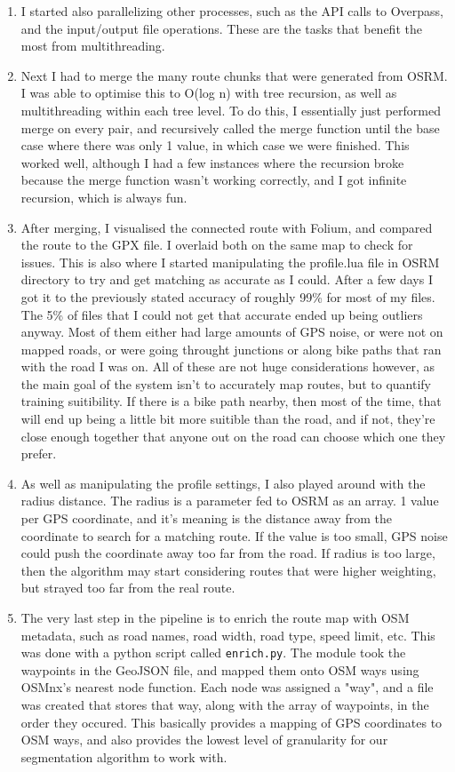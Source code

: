 \documentclass[11pt,a4paper]{report}
\begin{document}
\begin{enumerate}
	\item I started also parallelizing other processes, such as the API calls to Overpass, and the input/output file operations. These are the tasks that benefit the most from multithreading.
	\item Next I had to merge the many route chunks that were generated from OSRM. I was able to optimise this to O(log n) with tree recursion, as well as multithreading within each tree level. To do this, I essentially
	      just performed merge on every pair, and recursively called the merge function until the base case where there was only 1 value, in which case we were finished. This worked well, although I had a few instances
	      where the recursion broke because the merge function wasn't working correctly, and I got infinite recursion, which is always fun.
	\item After merging, I visualised the connected route with Folium, and compared the route to the GPX file. I overlaid both on the same map to check for issues. This is also where I started manipulating the profile.lua file in OSRM directory
	      to try and get matching as accurate as I could. After a few days I got it to the previously stated accuracy of roughly 99\% for most of my files. The 5\% of files that I could not get that accurate ended up being outliers anyway. Most of them
	      either had large amounts of GPS noise, or were not on mapped roads, or were going throught junctions or along bike paths that ran with the road I was on. All of these are not huge considerations however,
	      as the main goal of the system isn't to accurately map routes, but to quantify training suitibility. If there is a bike path nearby, then most of the time, that will end up being
	      a little bit more suitible than the road, and if not, they're close enough together that anyone out on the road can choose which one they prefer.
	\item As well as manipulating the profile settings, I also played around with the radius distance. The radius is a parameter fed to OSRM as an array. 1 value per GPS coordinate, and it's meaning
	      is the distance away from the coordinate to search for a matching route. If the value is too small, GPS noise could push the coordinate away too far from the road. If radius is too large, then
	      the algorithm may start considering routes that were higher weighting, but strayed too far from the real route.
	\item The very last step in the pipeline is to enrich the route map with OSM metadata, such as road names, road width, road type, speed limit, etc. This was done with a python script called \texttt{enrich.py}.
	      The module took the waypoints in the GeoJSON file, and mapped them onto OSM ways using OSMnx's nearest node function. Each node was assigned a "way", and a file was created that stores that way, along with the array of waypoints, in the order they occured.
	      This basically provides a mapping of GPS coordinates to OSM ways, and also provides the lowest level of granularity for our segmentation algorithm to work with.
\end{enumerate}
\end{document}
